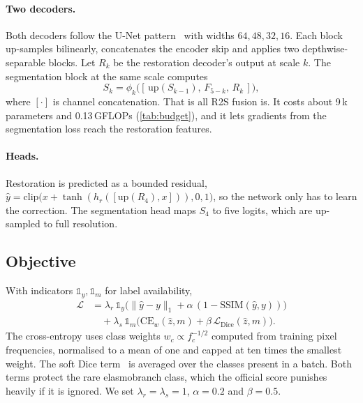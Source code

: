 \documentclass[10pt,twocolumn,letterpaper]{article}
\begin{document}
\paragraph{Two decoders.} Both decoders follow the U-Net pattern~\cite{ronneberger2015unet} with widths
$64,48,32,16$. Each block up-samples bilinearly, concatenates the encoder skip and applies two
depthwise-separable blocks. Let $R_k$ be the restoration decoder's output at scale $k$. The segmentation block
at the same scale computes
\begin{equation}
S_k=\phi_k\big([\,\mathrm{up}(S_{k-1}),\,F_{5-k},\,R_k\,]\big),
\label{eq:fusion}
\end{equation}
where $[\cdot]$ is channel concatenation. That is all R2S fusion is. It costs about 9\,k parameters and
0.13\,GFLOPs (\cref{tab:budget}), and it lets gradients from the segmentation loss reach the restoration
features.

\paragraph{Heads.} Restoration is predicted as a bounded residual,
$\hat y=\mathrm{clip}\big(x+\tanh(h_r([\mathrm{up}(R_4),x])),0,1\big)$, so the network only has to learn the
correction. The segmentation head maps $S_4$ to five logits, which are up-sampled to full resolution.

\subsection{Objective}
With indicators $\mathbb{1}_y,\mathbb{1}_m$ for label availability,
\begin{align}
\mathcal{L}&=\lambda_r\,\mathbb{1}_y\big(\lVert\hat y-y\rVert_1+\alpha\,(1-\mathrm{SSIM}(\hat y,y))\big)\nonumber\\
&\quad+\lambda_s\,\mathbb{1}_m\big(\mathrm{CE}_w(\hat z,m)+\beta\,\mathcal{L}_{\mathrm{Dice}}(\hat z,m)\big).
\label{eq:loss}
\end{align}
The cross-entropy uses class weights $w_c\propto f_c^{-1/2}$ computed from training pixel frequencies,
normalised to a mean of one and capped at ten times the smallest weight. The soft Dice
term~\cite{milletari2016vnet} is averaged over the classes present in a batch. Both terms protect the rare
elasmobranch class, which the official score punishes heavily if it is ignored. We set $\lambda_r=\lambda_s=1$,
$\alpha=0.2$ and $\beta=0.5$.
\end{document}
